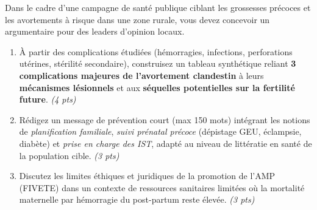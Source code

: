 \documentclass[11pt]{article}
\begin{document}
\begin{exercice}
Dans le cadre d'une campagne de santé publique ciblant les grossesses précoces et les avortements à risque dans une zone rurale, vous devez concevoir un argumentaire pour des leaders d'opinion locaux.
\begin{enumerate}
    \item À partir des complications étudiées (hémorragies, infections, perforations utérines, stérilité secondaire), construisez un tableau synthétique reliant \textbf{3 complications majeures de l'avortement clandestin} à leurs \textbf{mécanismes lésionnels} et aux \textbf{séquelles potentielles sur la fertilité future}. \textit{(4 pts)}
    \item Rédigez un message de prévention court (max 150 mots) intégrant les notions de \textit{planification familiale}, \textit{suivi prénatal précoce} (dépistage GEU, éclampsie, diabète) et \textit{prise en charge des IST}, adapté au niveau de littératie en santé de la population cible. \textit{(3 pts)}
    \item Discutez les limites éthiques et juridiques de la promotion de l'AMP (FIVETE) dans un contexte de ressources sanitaires limitées où la mortalité maternelle par hémorragie du post-partum reste élevée. \textit{(3 pts)}
\end{enumerate}
\end{exercice}
\end{document}
